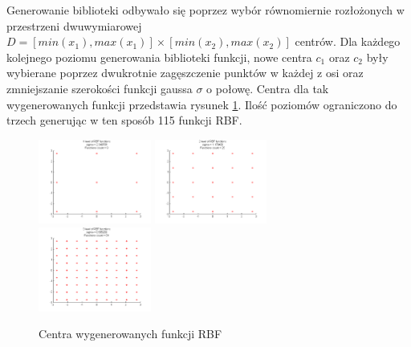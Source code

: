 Generowanie biblioteki odbywało się poprzez wybór równomiernie rozłożonych w przestrzeni dwuwymiarowej $D = [min(x_1),max(x_1)] \times [min(x_2),max(x_2)]$ centrów. Dla każdego kolejnego poziomu generowania biblioteki funkcji, nowe centra $c_1$ oraz $c_2$ były wybierane poprzez dwukrotnie zagęszczenie punktów w każdej z osi oraz zmniejszanie szerokości funkcji gaussa $\sigma$ o połowę. Centra dla tak wygenerowanych funkcji przedstawia rysunek \ref{img:rbf_centers}. Ilość poziomów ograniczono do trzech generując w ten sposób 115 funkcji RBF.

\begin{figure}[ht!]
	\centering	
	
	\subfloat
	{\includegraphics[width=0.33\textwidth]
	{images/centers1.png}}
	\subfloat
	{\includegraphics[width=0.33\textwidth]
	{images/centers2.png}}
	\subfloat
	{\includegraphics[width=0.33\textwidth]
	{images/centers3.png}}

	\caption{Centra wygenerowanych funkcji RBF}
	\label{img:rbf_centers}
\end{figure}


